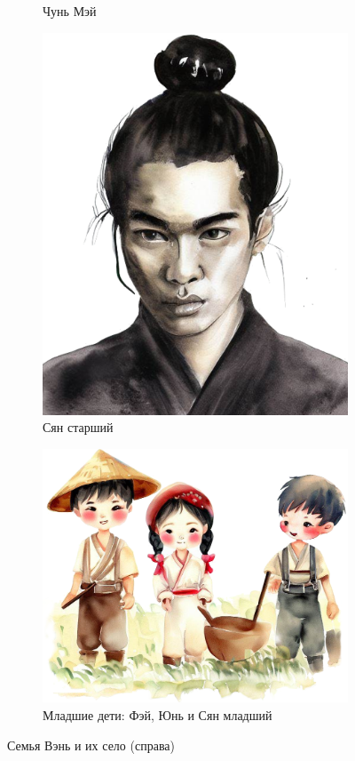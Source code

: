 \documentclass[a5paper,11pt]{memoir}
\begin{document}
\begin{figure}[h]
\begin{subfigure}{.3\textwidth}
		\caption{Чунь Мэй}
	\end{subfigure}%
\begin{subfigure}{.3\textwidth}
	\centering
	\includegraphics[width=.8\linewidth]{images/lao-elder-son.png}
	\caption{Сян старший}
\end{subfigure}

	\begin{subfigure}{\textwidth}
	\vspace{2cm}
		\centering
		\includegraphics[width=.7\linewidth]{images/lao-kids.png}
		\caption{Младшие дети: Фэй, Юнь и Сян младший}
	\end{subfigure}
	\caption{Семья Вэнь и их село (справа)}
\end{figure}
\end{document}
